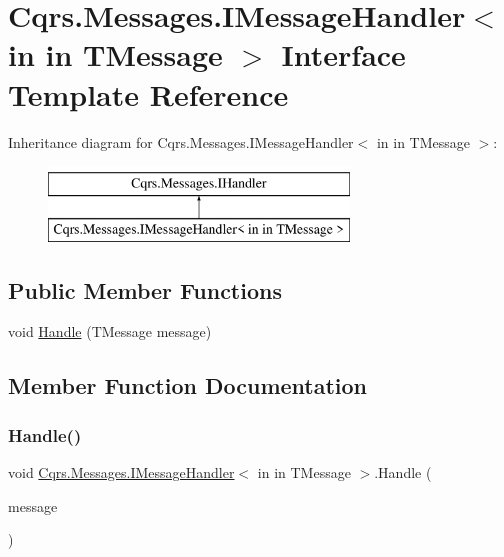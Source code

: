 \hypertarget{interfaceCqrs_1_1Messages_1_1IMessageHandler}{}\section{Cqrs.\+Messages.\+I\+Message\+Handler$<$ in in T\+Message $>$ Interface Template Reference}
\label{interfaceCqrs_1_1Messages_1_1IMessageHandler}
Inheritance diagram for Cqrs.\+Messages.\+I\+Message\+Handler$<$ in in T\+Message $>$\+:\begin{figure}[H]
\begin{center}
\leavevmode
\includegraphics[height=2.000000cm]{interfaceCqrs_1_1Messages_1_1IMessageHandler}
\end{center}
\end{figure}
\subsection*{Public Member Functions}
\begin{DoxyCompactItemize}
\item 
void \hyperlink{interfaceCqrs_1_1Messages_1_1IMessageHandler_a4d68d2c919afce06ce893caabd73f424_a4d68d2c919afce06ce893caabd73f424}{Handle} (T\+Message message)
\end{DoxyCompactItemize}


\subsection{Member Function Documentation}
\mbox{\label{interfaceCqrs_1_1Messages_1_1IMessageHandler_a4d68d2c919afce06ce893caabd73f424_a4d68d2c919afce06ce893caabd73f424}} 
\subsubsection{\texorpdfstring{Handle()}{Handle()}}
{\footnotesize\ttfamily void \hyperlink{interfaceCqrs_1_1Messages_1_1IMessageHandler}{Cqrs.\+Messages.\+I\+Message\+Handler}$<$ in in T\+Message $>$.Handle (\begin{DoxyParamCaption}\item[{T\+Message}]{message }\end{DoxyParamCaption})}

